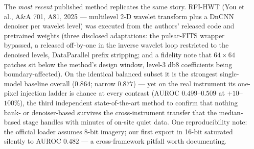 \documentclass[journal]{IEEEtran}
\begin{document}
The \emph{most recent} published method replicates the same story.  RFI-HWT
(You et al., A\&A 701, A81, 2025 --- multilevel 2-D wavelet transform plus a
DnCNN denoiser per wavelet level) was executed from the authors' released
code and pretrained weights (three disclosed adaptations: the pulsar-FITS
wrapper bypassed, a released off-by-one in the inverse wavelet loop
restricted to the denoised levels, DataParallel prefix stripping; and a
fidelity note that $64{\times}64$ patches sit below the method's design
window, level-3 db8 coefficients being boundary-affected).  On the identical
balanced subset it is the strongest single-model baseline overall
($0.864$; narrow $0.877$) --- yet on the real instrument its one-pixel
injection ladder is chance at every contrast (AUROC $0.499$--$0.509$ at
$+10$--$100\%$), the third independent state-of-the-art method to confirm
that nothing bank- or denoiser-based survives the cross-instrument transfer
that the median-based stage handles with minutes of on-site quiet data.
One reproducibility note: the official loader assumes 8-bit imagery; our
first export in 16-bit saturated silently to AUROC $0.482$ --- a
cross-framework pitfall worth documenting.
\end{document}
